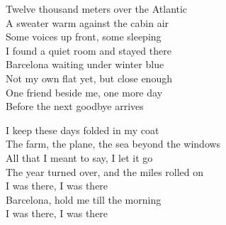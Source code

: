 \begin{lyrics}
Twelve thousand meters over the Atlantic\\
A sweater warm against the cabin air\\
Some voices up front, some sleeping\\
I found a quiet room and stayed there\\
Barcelona waiting under winter blue\\
Not my own flat yet, but close enough\\
One friend beside me, one more day\\
Before the next goodbye arrives

I keep these days folded in my coat\\
The farm, the plane, the sea beyond the windows\\
All that I meant to say, I let it go\\
The year turned over, and the miles rolled on\\
I was there, I was there\\
Barcelona, hold me till the morning\\
I was there, I was there
\end{lyrics}

